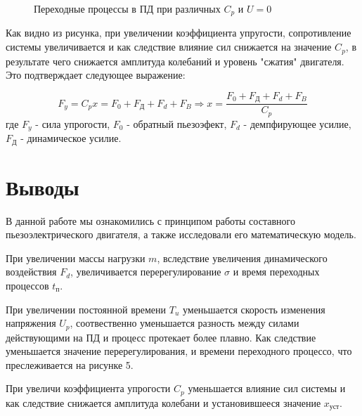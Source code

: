\documentclass[a4paper, 12pt]{article}
\begin{document}
\begin{figure}[h!]
    \begin{subfigure}{\textwidth}
        \centering
    \end{subfigure}
    \vspace{0.5cm}
    \caption{Переходные процессы в ПД при различных $C_p$ и $U = 0$}
\end{figure} \par

Как видно из рисунка, при увеличении коэффициента упругости, сопротивление системы увеличивается и как следствие влияние сил снижается на значение $C_p$, в результате чего снижается амплитуда колебаний и уровень "сжатия" двигателя. Это подтверждает следующее выражение:

\begin{equation*}
   F_y = C_px = F_0 + F_\text{Д} + F_d + F_B \Rightarrow x = \frac{F_0 + F_\text{Д} + F_d + F_B}{C_p}
\end{equation*}
где $F_y$ - сила упрогости, $F_0$ - обратный пьезоэфект, $F_d$ - демпфирующее усилие, $F_\text{Д}$ - динамическое усилие.

\newpage
\section*{\centering Выводы}
В данной работе мы ознакомились с принципом работы составного пьезоэлектрического двигателя, а также исследовали его математическую модель.\par
При увеличении массы нагрузки $m$, вследствие увеличения динамического воздействия $F_d$, увеличивается перерегулирование $\sigma$ и время переходных процессов $t_\text{п}$. \par
При увеличении постоянной времени $T_u$ уменьшается скорость изменения напряжения $U_p$, соотвественно уменьшается разность между силами действующими на ПД и процесс протекает более плавно. Как следствие уменьшается значение перерегулирования, и времени переходного процессо, что преслеживается на рисунке 5. \par
При увеличи коэффициента упрогости $C_p$ уменьшается влияние сил системы и как следствие снижается амплитуда колебани и установившееся значение $x_\text{уст}$. 
\end{document}
